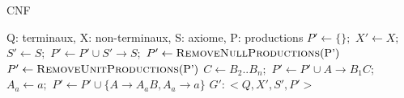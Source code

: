 \documentclass{beamer}
\begin{document}
\begin{algorithm}
\caption{CNF}
\label{cnf}
	\small{\begin{algorithmic}
		 \Comment Q: terminaux, X: non-terminaux, S: axiome, P: productions
			\State $P' \gets \{\};$
			\State $X' \gets X;$
				\State $S' \gets S;$
				\State $P' \gets P' \cup S' \rightarrow S;$
			\EndIf
			\State $P' \gets \Call{RemoveNullProductions}{$P'$}$
			\State $P' \gets \Call{RemoveUnitProductions}{$P'$}$
				\State $C \gets B_2..B_n;$
				\State $P' \gets P' \cup A \rightarrow B_1C;$
			\EndFor
				\State $A_a \gets a;$
				\State $P' \gets P' \cup \{ A \rightarrow A_aB, A_a \rightarrow a \}$
			\EndFor
			\State \Return $G': < Q, X', S', P' >$
		\EndFunction
	\end{algorithmic}}
\end{algorithm}


%
%
%
%
%
%
\end{document}
